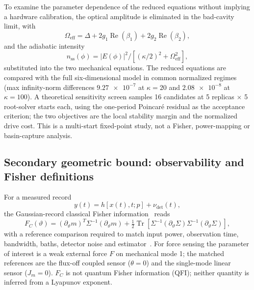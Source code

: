 \documentclass[preprint,numbers,a4paper]{elsarticle}
\newcommand{\Tr}{\operatorname{Tr}}
\begin{document}
To examine the parameter dependence of the reduced equations without implying a hardware calibration, the optical amplitude is eliminated in the bad-cavity limit, with
\begin{equation}
 \Omega_{\mathrm{eff}}=\Delta+2g_1\operatorname{Re}(\beta_1)+2g_2\operatorname{Re}(\beta_2),
\end{equation}
and the adiabatic intensity
\begin{equation}
 n_{\mathrm{ss}}(\phi)=|E(\phi)|^2/[(\kappa/2)^2+\Omega_{\mathrm{eff}}^2],
\label{eq:adiabatic-intensity}
\end{equation}
substituted into the two mechanical equations. The reduced equations are compared with the full six-dimensional model in common normalized regimes (max infinity-norm differences $\num{9.27e-7}$ at $\kappa=20$ and $\num{2.08e-8}$ at $\kappa=100$). A theoretical sensitivity screen samples 16 candidates at 5 replicas $\times$ 5 root-solver starts each, using the one-period Poincar\'e residual as the acceptance criterion; the two objectives are the local stability margin and the normalized drive cost. This is a multi-start fixed-point study, not a Fisher, power-mapping or basin-capture analysis.

\subsection{Secondary geometric bound: observability and Fisher definitions}

For a measured record
\begin{equation}
y(t)=h[x(t),t;p]+\nu_{\mathrm{det}}(t),
\end{equation}
the Gaussian-record classical Fisher information~\cite{clerk2010,gardiner1985,walls2008,ford1988} reads
\begin{equation}
F_C(\vartheta)=
(\partial_\vartheta m)^T\Sigma^{-1}(\partial_\vartheta m)
+\tfrac12\Tr\!\left[\Sigma^{-1}(\partial_\vartheta\Sigma)\Sigma^{-1}(\partial_\vartheta\Sigma)\right],
\label{eq:fisher}
\end{equation}
with a reference comparison required to match input power, observation time, bandwidth, baths, detector noise and estimator~\cite{braunstein1994,purdy2017,teufel2011,gavartin2012,li2021a,qvarfort2018,pezze2009}. For force sensing the parameter of interest is a weak external force $F$ on mechanical mode 1; the matched references are the flux-off coupled sensor ($\theta=0$) and the single-mode linear sensor ($J_m=0$). $F_C$ is not quantum Fisher information (QFI); neither quantity is inferred from a Lyapunov exponent.
\end{document}
